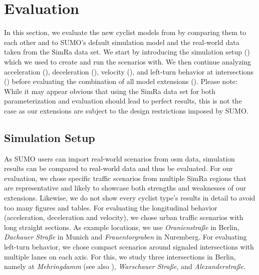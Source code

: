 \section{Evaluation}
\label{sec:evaluation_sumo}
In this section, we evaluate the new cyclist models from  by comparing them to each other and to SUMO's default simulation model and the real-world data taken from the SimRa data set.
We start by introducing the simulation setup () which we used to create and run the scenarios with.
We then continue analyzing acceleration (), deceleration (), velocity (), and left-turn behavior at intersections () before evaluating the combination of all model extensions ().
Please note: While it may appear obvious that using the SimRa data set for both parameterization and evaluation should lead to perfect results, this is not the case as our extensions are subject to the design restrictions imposed by SUMO.

\subsection{Simulation Setup}
\label{subsec:simulation_setup}
As SUMO users can import real-world scenarios from \ac{osm} data, simulation results can be compared to real-world data and thus be evaluated.
For our evaluation, we chose specific traffic scenarios from multiple SimRa regions that are representative and likely to showcase both strengths and weaknesses of our extensions.
Likewise, we do not show every cyclist type's results in detail to avoid too many figures and tables.
For evaluating the longitudinal behavior (acceleration, deceleration and velocity), we chose urban traffic scenarios with long straight sections.
As example locations, we use \textit{Oranienstraße} in Berlin, \textit{Dachauer Straße} in Munich and \textit{Frauentorgraben} in Nuremberg.
For evaluating left-turn behavior, we chose compact scenarios around signaled intersections with multiple lanes on each axis.
For this, we study three intersections in Berlin, namely at \textit{Mehringdamm} (see also ), \textit{Warschauer Straße}, and \textit{Alexanderstraße}.

